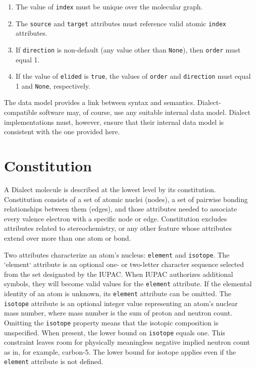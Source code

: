 \documentclass{article}
\def\ttt{\texttt}
\begin{document}
\begin{enumerate}
    \item{The value of \ttt{index} must be unique over the molecular graph.}
    \item{The \ttt{source} and \ttt{target} attributes must reference valid atomic \ttt{index} attributes.}
    \item{If \ttt{direction} is non-default (any value other than \ttt{None}), then \ttt{order} must equal 1.}
    \item{If the value of \ttt{elided} is \ttt{true}, the values of \ttt{order} and \ttt{direction} must equal 1 and \ttt{None}, respectively.}
\end{enumerate}

The data model provides a link between syntax and semantics. Dialect-compatible software may, of course, use any suitable internal data model. Dialect implementations must, however, ensure that their internal data model is consistent with the one provided here.

\section*{Constitution}

A Dialect molecule is described at the lowest level by its constitution. Constitution consists of a set of atomic nuclei (nodes), a set of pairwise bonding relationships between them (edges), and those attributes needed to associate every valence electron with a specific node or edge. Constitution excludes attributes related to stereochemistry, or any other feature whose attributes extend over more than one atom or bond.

Two attributes characterize an atom's nucleus: \ttt{element} and \ttt{isotope}. The `element` attribute is an optional one- or two-letter character sequence selected from the set designated by the IUPAC.\cite{periodicTable} When IUPAC authorizes additional symbols, they will become valid values for the \ttt{element} attribute. If the elemental identity of an atom is unknown, its \ttt{element} attribute can be omitted. The \ttt{isotope} attribute is an optional integer value representing an atom's nuclear mass number, where mass number is the sum of proton and neutron count. Omitting the \ttt{isotope} property means that the isotopic composition is unspecified. When present, the lower bound on \ttt{isotope} equals one. This constraint leaves room for physically meaningless negative implied neutron count as in, for example, carbon-5. The lower bound for isotope applies even if the \ttt{element} attribute is not defined.
\end{document}
